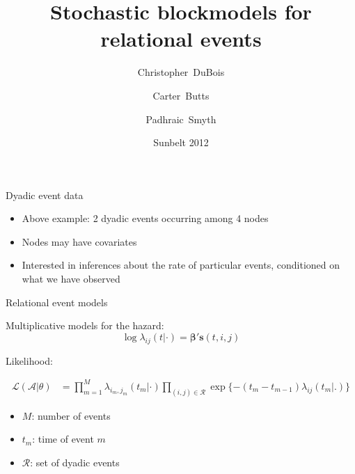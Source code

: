 \documentclass{beamer}
\title[Blockmodels for relational events]%
{Stochastic blockmodels for relational events}
\subtitle{}
\author[DuBois, Christopher] %
{Christopher~DuBois\inst{1} \and Carter~Butts\inst{2} \and Padhraic~Smyth\inst{3}}
\institute[] %
{
  \inst{1}%
Department of Statistics \\
University of California, Irvine
  \and
  \inst{2}%
Department of Sociology \\
University of California, Irvine
  \and
  \inst{2}%
Department of Computer Science \\
University of California, Irvine
}
\date[Sunbelt 2012] %
{Sunbelt 2012}
\begin{document}
\frame{\titlepage}

\begin{frame}{Dyadic event data}
\begin{figure}
{
}
\end{figure}

\begin{itemize}
\item Above example: 2 dyadic events occurring among 4 nodes
\item Nodes may have covariates
\item Interested in inferences about the rate of particular events, conditioned on what we have observed
\end{itemize}
\end{frame}

\begin{frame}{Relational event models}

Multiplicative models for the hazard:
$$\log \lambda_{ij}(t | \cdot) = \boldsymbol{\beta}' \mathbf{s}(t,i,j)$$

Likelihood:

\begin{align}
\mathcal{L}(\mathcal{A}|\theta) &= \prod_{m=1}^M \lambda_{i_m,j_m}(t_m|\cdot) \prod_{(i,j) \in \mathcal{R}}\exp\{ - (t_m - t_{m-1}) \lambda_{ij}(t_m | .) \}
\end{align}

\begin{itemize}
\item $M$: number of events
\item $t_m$: time of event $m$
\item $\mathcal{R}$: set of dyadic events
\end{itemize}

\end{frame}
\end{document}
